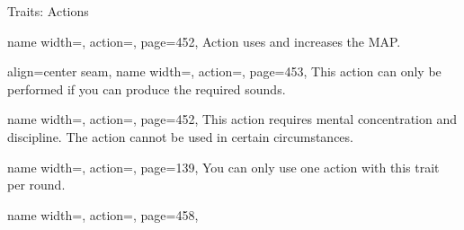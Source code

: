 \renewcommand{\PageBottomReferences}{%
    \hfill LCR = Legacy Core Rulebook
    \hfill DA = Dark Archive
    \hfill GnM = Gods and magic
    \hfill GMC = GM Core\\
    \hfill SoM = Secrets of Magic
    \hfill GG = Guns \& Gears
    \hfill TV = Treasure Vault
    \hfill AG = Ancestry Guide
    \hfill ME = Magwani Expanse
    \hfill Le = Legends
}%
\setlength{\parindent}{0mm}%
\begin{PageFrontLandscape}
    \begin{TablesHalf}{\frontTableHeight}
        \begin{Table}{Traits: Actions}
            \begin{entry}{}{%
                name width=\conditionLength,%
                action=\Attack,
                page=452,
            }
                Action uses  and increases the MAP. \hfill
            \end{entry}
            \begin{entry}{}{%
                align=center seam,
                name width=\conditionLength,%
                action=\Auditory,
                page=453,
            }
                This action can only be performed if you can produce the required sounds.\\
            \end{entry}
            \begin{entry}{}{%
                name width=\conditionLength,%
                action=\Concentrate,
                page=452,
            }
                This action requires mental concentration and discipline.
                The action cannot be used in certain circumstances.
            \end{entry}
            \begin{entry}{}{%
                name width=\conditionLength,%
                action=\Flourish,
                page=139,
            }
                You can only use one action with this trait per round.
            \end{entry}
            \begin{entry}{}{%
                name width=\conditionLength,%
                action=\Manipulate,
                page=458,
            }

\end{entry}
\end{Table}
\end{TablesHalf}
\end{PageFrontLandscape}

